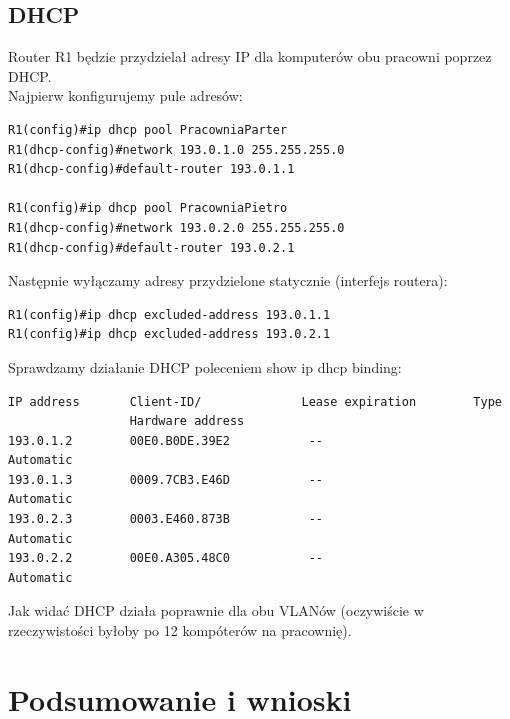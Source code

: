 \documentclass[11pt,a4paper]{article}
\begin{document}

\subsection{DHCP}
Router R1 będzie przydzielał adresy IP dla komputerów obu pracowni poprzez DHCP.\\
Najpierw konfigurujemy pule adresów:
\begin{lstlisting}
R1(config)#ip dhcp pool PracowniaParter
R1(dhcp-config)#network 193.0.1.0 255.255.255.0
R1(dhcp-config)#default-router 193.0.1.1

R1(config)#ip dhcp pool PracowniaPietro
R1(dhcp-config)#network 193.0.2.0 255.255.255.0
R1(dhcp-config)#default-router 193.0.2.1
\end{lstlisting}
Następnie wyłączamy adresy przydzielone statycznie (interfejs routera):
\begin{lstlisting}
R1(config)#ip dhcp excluded-address 193.0.1.1
R1(config)#ip dhcp excluded-address 193.0.2.1
\end{lstlisting}

Sprawdzamy działanie DHCP poleceniem show ip dhcp binding:
\begin{lstlisting}
IP address       Client-ID/              Lease expiration        Type
                 Hardware address
193.0.1.2        00E0.B0DE.39E2           --                     Automatic
193.0.1.3        0009.7CB3.E46D           --                     Automatic
193.0.2.3        0003.E460.873B           --                     Automatic
193.0.2.2        00E0.A305.48C0           --                     Automatic
\end{lstlisting}
Jak widać DHCP działa poprawnie dla obu VLANów (oczywiście w rzeczywistości byłoby po 12 kompóterów na pracownię).
\section{Podsumowanie i wnioski}
\end{document}
